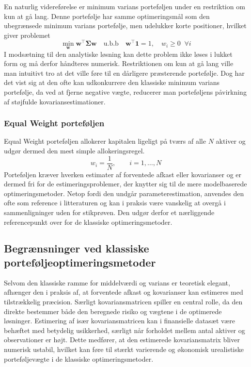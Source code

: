 \documentclass[../main.tex]{subfiles}
\begin{document}
En naturlig videreførelse er minimum varians porteføljen under en restriktion om kun at gå lang. Denne portefølje har samme optimeringsmål som den ubegrænsede minimum varians portefølje, men udelukker korte positioner, hvilket giver problemet
\begin{equation}
    \min_{\mathbf{w}} \mathbf{w}^\top \boldsymbol{\Sigma} \mathbf{w}
    \quad \text{u.b.b} \quad \mathbf{w}^\top \mathbf{1} = 1, \quad w_i \geq 0 \;\; \forall i
    \label{eq:mv_long_only}
\end{equation}
I modsætning til den analytiske løsning kan dette problem ikke løses i lukket form og må derfor håndteres numerisk. Restriktionen om kun at gå lang ville man intuitivt tro at det ville føre til en dårligere præsterende portefølje. Dog har det vist sig at den ofte kan udkonkurrere den klassiske minimum varians portefølje, da ved at fjerne negative vægte, reducerer man porteføljens påvirkning af støjfulde kovariansestimationer.\cite{jagannathan_risk_2003}

\subsubsection{Equal Weight porteføljen}
Equal Weight porteføljen allokerer kapitalen ligeligt på tværs af alle $N$ aktiver og udgør dermed den mest simple allokeringsregel.
\begin{equation}
    w_i = \frac{1}{N}, \qquad i = 1,\ldots,N
    \label{eq:equal_weight}
\end{equation}
Porteføljen kræver hverken estimater af forventede afkast eller kovarianser og er dermed fri for de estimeringsproblemer, der knytter sig til de mere modelbaserede optimeringsmetoder. Netop fordi den undgår parameterestimation, anvendes den ofte som reference i litteraturen og kan i praksis være vanskelig at overgå i sammenligninger uden for stikprøven.\cite{malladi_equal-weighted_2017} Den udgør derfor et nærliggende referencepunkt over for de klassiske optimeringsmetoder.

\subsection{Begrænsninger ved klassiske porteføljeoptimeringsmetoder}
Selvom den klassiske ramme for middelværdi og varians er teoretisk elegant, afhænger den i praksis af, at forventede afkast og kovarianser kan estimeres med tilstrækkelig præcision. Særligt kovariansmatricen spiller en central rolle, da den direkte bestemmer både den beregnede risiko og vægtene i de optimerede løsninger. 
Estimering af især kovariansmatricen kan i finansielle datasæt være behæftet med betydelig usikkerhed, særligt når forholdet mellem antal aktiver og observationer er højt. Dette medfører, at den estimerede kovariansmatrix bliver numerisk ustabil, hvilket kan føre til stærkt varierende og økonomisk urealistiske porteføljevægte i de klassiske optimeringsmetoder.
\cite{lopez_de_prado_building_2016}

\ifSubfilesClassLoaded{
    
    
}{}
\end{document}
